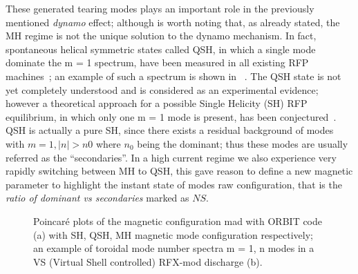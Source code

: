 These generated tearing modes plays an important role in the previously mentioned \textit{dynamo} effect; although is worth noting that, as already stated, the MH regime is not the unique solution to the dynamo mechanism. In fact, spontaneous helical symmetric states called \acl{QSH}, in which a single mode dominate the m = 1 spectrum, have been measured in all existing RFP machines~\cite{Martin_1999}; an example of such a spectrum is shown in~\Figure{\ref{fig:MHQSH_b}} . The QSH state is not yet completely understood and is considered as an experimental evidence; however a theoretical approach for a possible Single Helicity (SH) RFP equilibrium, in which only one m = 1 mode is present, has been conjectured~\cite{Cappello_1996}. QSH is actually a pure SH, since there exists a residual background of modes with $m = 1, |n| > n0$ where $n_0$ being the dominant; thus these modes are usually referred as the “secondaries”. In a high current regime we also experience very rapidly switching between MH to QSH, this gave reason to define a new magnetic parameter to highlight the instant state of modes raw configuration, that is the \textit{ratio of dominant vs secondaries} marked as $NS$.
\begin{figure}
    \centering
    \caption{Poincaré plots of the magnetic configuration mad with ORBIT code (a) with SH, QSH, MH magnetic mode configuration     respectively; an example of toroidal mode number spectra m = 1, n modes in a VS (Virtual Shell controlled) RFX-mod discharge (b). }
    \label{img:MHQSH_b}
\end{figure}















